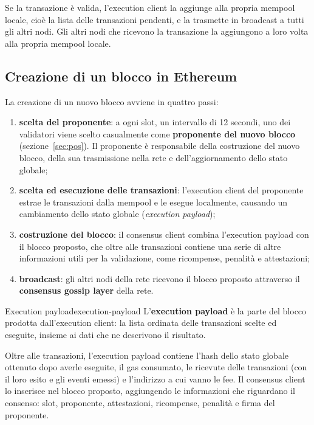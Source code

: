 \documentclass[a4paper, 11pt, oneside]{book}
\begin{document}
	Se la transazione è valida, l'execution client la aggiunge alla propria mempool
	locale, cioè la lista delle transazioni pendenti, e la trasmette in broadcast a
	tutti gli altri nodi. Gli altri nodi che ricevono la transazione la aggiungono a
	loro volta alla propria mempool locale.

	\subsection{Creazione di un blocco in Ethereum}
	La creazione di un nuovo blocco avviene in quattro passi:
	\begin{enumerate}
		\item \textbf{scelta del proponente}: a ogni slot, un intervallo di 12 secondi, uno
			dei validatori viene scelto casualmente come \textbf{proponente del nuovo
			blocco} (sezione~\ref{sec:pos}). Il proponente è responsabile della
			costruzione del nuovo blocco, della sua trasmissione nella rete e
			dell'aggiornamento dello stato globale;
		\item \textbf{scelta ed esecuzione delle transazioni}: l'execution client del
			proponente estrae le transazioni dalla mempool e le esegue localmente,
			causando un cambiamento dello stato globale (\textit{execution payload});
		\item \textbf{costruzione del blocco}: il consensus client combina l'execution
			payload con il blocco proposto, che oltre alle transazioni contiene una serie
			di altre informazioni utili per la validazione, come ricompense, penalità e
			attestazioni;
		\item \textbf{broadcast}: gli altri nodi della rete ricevono il blocco proposto
			attraverso il \textbf{consensus gossip layer} della rete.
	\end{enumerate}

	\begin{definizione}{Execution payload}{execution-payload}
		L'\textbf{execution payload} è la parte del blocco prodotta dall'execution client:
		la lista ordinata delle transazioni scelte ed eseguite, insieme ai dati che ne
		descrivono il risultato.
	\end{definizione}

	Oltre alle transazioni, l'execution payload contiene l'hash dello stato globale
	ottenuto dopo averle eseguite, il gas consumato, le ricevute delle transazioni (con
	il loro esito e gli eventi emessi) e l'indirizzo a cui vanno le fee. Il consensus
	client lo inserisce nel blocco proposto, aggiungendo le informazioni che riguardano
	il consenso: slot, proponente, attestazioni, ricompense, penalità e firma del
	proponente.
\end{document}
